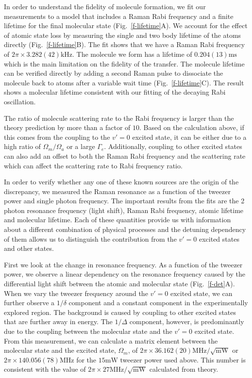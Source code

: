 \documentclass[aps,prl,twocolumn,superscriptaddress]{revtex4-1}
\newcommand{\todo}[1]{}
\begin{document}
In order to understand the fidelity of molecule formation, we fit our measurements to a model that includes a Raman Rabi frequency and a finite lifetime for the final molecular state (Fig.~\ref{f-lifetime}A). We account for the effect of atomic state loss by measuring the single and two body lifetime of the atoms directly (Fig.~\ref{f-lifetime}B). The fit shows that we have a Raman Rabi frequency of $2\pi\times3.282(42) \mathrm{kHz}$. The molecule we form has a lifetime of $0.204(13) \mathrm{ms}$ which is the main limitation on the fidelity of the transfer. The molecule lifetime can be verified directly by adding a second Raman pulse to dissociate the molecule back to atoms after a variable wait time (Fig.~\ref{f-lifetime}C). The result shows a molecular lifetime consistent with our fitting of the decaying Rabi oscillation.

The ratio of molecule scattering rate to the Rabi frequency is larger than the theory prediction
by more than a factor of $10$.
Based on the calculation above, if this comes from the coupling to the $v'=0$ excited state,
it can be either due to a high ratio of $\Omega_m / \Omega_a$ or a large $\Gamma_e$.
Additionally, coupling to other excited states can also add an offset to both the Raman
Rabi frequency and the scattering rate which can affect the scattering rate
to Rabi frequency ratio.

In order to verify whether any one of these known sources are the origin of the discrepancy,
we measured the Raman resonance as a function of the tweezer power and single photon frequency.
The important results from the fits are the 2 photon resonance frequency (light shift),
Raman Rabi frequency, atomic lifetime and molecular lifetime.
Each of these quantities provide us with information about a different combination
of physical processes and the detuning dependency of them allows us
to distinguish the contribution from the $v'=0$ excited states and other states.

First we look at the change in resonance frequency.
As a function of the tweezer power, we observe a linear dependency on the resonance frequency
caused by the differential light shift between the atomic and molecular state (Fig.~\ref{f-det}A).
When we vary the tweezer frequency around the $v'=0$ excited state,
we can further observe a $1/\delta$ component and a constant component
in the experimentally explored region.
The background is caused by coupling to other excited states that are further away in energy.
The $1/\Delta$ component, however, is predominantly due to the coupling between
the molecular state and the $v'=0$ excited state.
From this measurement, we can calculate a matrix element between the molecular state and
the excited state, $\Omega_m$, of $2\pi\times36.162(20) \mathrm{MHz}/\sqrt{\mathrm{mW}}$
or $2\pi\times140.056(78) \mathrm{MHz}$ for the $15 \mathrm{mW}$ tweezer power used above.
This number is consistent with the value of
$2\pi\times27 \mathrm{MHz}/\sqrt{\mathrm{mW}}$ calculated from theory. \todo{ref/sm theory}
\todo{make sure theory part mentions $\Omega_{down}\gg\Omega_{up}$,
  also $\Omega$ vs $\Omega'$ for the single leg vs cross coupling number.}
\end{document}
